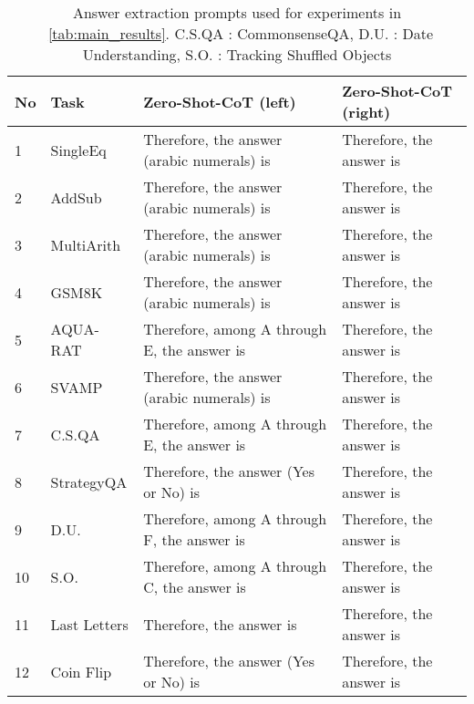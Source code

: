 \begin{table}[h]\centering
\caption{Answer extraction prompts used for \ours experiments in ~\autoref{tab:main_results}. C.S.QA : CommonsenseQA, D.U. : Date Understanding, S.O. : Tracking Shuffled Objects}
\label{tab:answer_prompts_2}
\begin{tabular}{p{}p{}p{}p{}}
\toprule

No &Task &Zero-Shot-CoT (left) &Zero-Shot-CoT (right) \\

\midrule

1 &SingleEq &Therefore, the answer (arabic numerals) is &Therefore, the answer is \\
2 &AddSub &Therefore, the answer (arabic numerals) is &Therefore, the answer is \\
3 &MultiArith &Therefore, the answer (arabic numerals) is &Therefore, the answer is \\
4 &GSM8K &Therefore, the answer (arabic numerals) is &Therefore, the answer is \\
5 &AQUA-RAT &Therefore, among A through E, the answer is &Therefore, the answer is \\
6 &SVAMP &Therefore, the answer (arabic numerals) is &Therefore, the answer is \\
7 &C.S.QA &Therefore, among A through E, the answer is &Therefore, the answer is \\
8 &StrategyQA &Therefore, the answer (Yes or No) is &Therefore, the answer is \\
9 &D.U. &Therefore, among A through F, the answer is &Therefore, the answer is \\
10 &S.O. &Therefore, among A through C, the answer is &Therefore, the answer is \\
11 &Last Letters &Therefore, the answer is &Therefore, the answer is \\
12 &Coin Flip &Therefore, the answer (Yes or No) is &Therefore, the answer is \\
\bottomrule
\end{tabular}
\end{table}